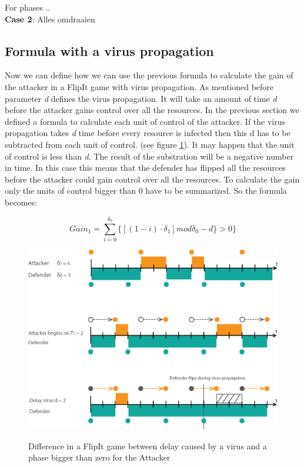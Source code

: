 For phases .. \\

\textbf{Case 2}:
Alles omdraaien 



\subsection{Formula with a virus propagation}
Now we can define how we can use the previous formula to calculate the gain of the attacker in a FlipIt game with virus propagation.
As mentioned before parameter \textit{d} defines the virus propagation. It will take an amount of time \textit{d} before the attacker gains control over all the resources. In the previous section we defined a formula to calculate each unit of control of the attacker. If the virus propagation takes \textit{d} time before every resource is infected then this d has to be subtracted from each unit of control. (see figure \ref{fig:virusflip}). It may happen that the unit of control is less than \textit{d}. The result of the substration will be a negative number in time. In this case this means that the defender has flipped all the resources before the attacker could gain control over all the resources. To calculate the gain only the units of control bigger than 0 have to be summarized. So the formula becomes:

\begin{equation}\label{first}
Gain_{1} = \sum_{i=0}^{\delta_{0}} \lbrace [( 1 - i ) \cdot \delta_{1}] mod \delta_{0} - d \rbrace  > 0 \rbrace 
\end{equation}

\begin{figure}[hbtp]
\caption{Difference in a FlipIt game between delay caused by a virus and a phase bigger than zero for the Attacker}
\centering
\includegraphics[scale=1]{Images/Flipvirus}
\label{fig:virusflip}
\end{figure}


